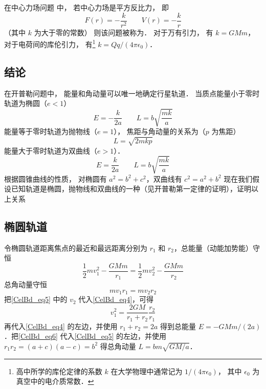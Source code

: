 

在中心力场问题 中， 若中心力场是平方反比力， 即
\begin{equation}
F(r) = -\frac{k}{r^2}  \qquad V(r) = -\frac{k}{r}
\end{equation}
（其中 $k$ 为大于零的常数） 则该问题被称为． 对于万有引力， 有 $k = GMm$， 对于电荷间的库伦引力， 有\footnote{高中所学的库伦定律的系数 $k$ 在大学物理中通常记为 $1/(4\pi\epsilon_0)$， 其中 $\epsilon_0$ 为真空中的电介质常数．} $k = Qq/(4\pi\epsilon_0)$．

\subsection{结论}
在开普勒问题中， 能量和角动量可以唯一地确定行星轨道． 当质点能量小于零时轨道为椭圆（$e<1$）
\begin{equation}
E=-\frac{k}{2a} \qquad  L = b \sqrt{\frac{mk}{a}}
\end{equation}
能量等于零时轨道为抛物线（$e=1$）， 焦距与角动量的关系为（$p$ 为焦距）
\begin{equation}
L = \sqrt{2mkp}
\end{equation}
能量大于零时轨道为双曲线（$e>1$）．
\begin{equation}
E=\frac{k}{2a}  \qquad  L = b \sqrt{\frac{mk}{a}}
\end{equation}
根据圆锥曲线的性质， 对椭圆有 $a^2=b^2+c^2$，双曲线有 $c^2=a^2+b^2$
现在我们假设已知轨道是椭圆，抛物线和双曲线的一种（见开普勒第一定律的证明），证明以上关系

\subsection{椭圆轨道}
令椭圆轨道距离焦点的最近和最远距离分别为 $r_1$ 和 $r_2$，总能量（动能加势能）守恒
\begin{equation}\label{CelBd_eq4}
\frac12 m v_1^2 - \frac{GMm}{r_1} = \frac12 mv_2^2 - \frac{GMm}{r_2}
\end{equation}
总角动量守恒
\begin{equation}\label{CelBd_eq5}
mv_1 r_1 = mv_2 r_2
\end{equation}
把\autoref{CelBd_eq5} 中的 $v_2$ 代入\autoref{CelBd_eq4}，可得
\begin{equation}\label{CelBd_eq6}
v_1^2 = \frac{2GM}{r_1 + r_2} \frac{r_2}{r_1}
\end{equation}
再代入\autoref{CelBd_eq4} 的左边，并使用 $r_1+r_2=2a$ %
得到总能量 $E=-GMm/(2a)$．把\autoref{CelBd_eq6} 代入\autoref{CelBd_eq5} 的左边，并使用 $r_1 r_2 = (a+c)(a-c) =b^2$ %
得总角动量 $L = bm \sqrt{GM/a}$．

